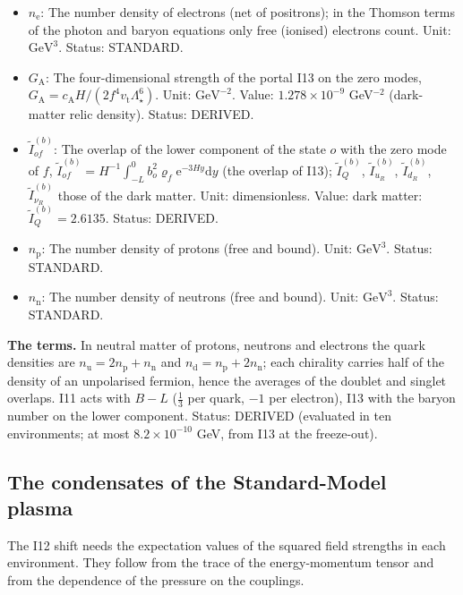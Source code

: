 \documentclass[
  10pt,
]{article}
\begin{document}
\begin{itemize}
  \(\tilde I_{e_R} = 0.3972\). Status: DERIVED.
\item
  \(n_{\mathrm{e}}\): The number density of electrons (net of
  positrons); in the Thomson terms of the photon and baryon equations
  only free (ionised) electrons count. Unit: \(\mathrm{GeV}^{3}\).
  Status: STANDARD.
\item
  \(G_{\mathrm{A}}\): The four-dimensional strength of the portal I13 on
  the zero modes,
  \(G_{\mathrm{A}} = c_{\mathrm{A}}H/(2f^4v_{\mathrm{t}}\Lambda_\star^6)\).
  Unit: \(\mathrm{GeV}^{-2}\). Value: \(1.278\times10^{-9}\)
  GeV\(^{-2}\) (dark-matter relic density). Status: DERIVED.
\item
  \(\tilde I^{(b)}_{of}\): The overlap of the lower component of the
  state \(o\) with the zero mode of \(f\),
  \(\tilde I^{(b)}_{of} = H^{-1}\int_{-L}^{0}b_o^2\varrho_f\mathrm{e}^{-3Hy}\mathrm{d}y\)
  (the overlap of I13); \(\tilde I^{(b)}_Q\), \(\tilde I^{(b)}_{u_R}\),
  \(\tilde I^{(b)}_{d_R}\), \(\tilde I^{(b)}_{\nu_R}\) those of the dark
  matter. Unit: dimensionless. Value: dark matter:
  \(\tilde I^{(b)}_Q = 2.6135\). Status: DERIVED.
\item
  \(n_{\mathrm{p}}\): The number density of protons (free and bound).
  Unit: \(\mathrm{GeV}^{3}\). Status: STANDARD.
\item
  \(n_{\mathrm{n}}\): The number density of neutrons (free and bound).
  Unit: \(\mathrm{GeV}^{3}\). Status: STANDARD.
\end{itemize}

\textbf{The terms.} In neutral matter of protons, neutrons and electrons
the quark densities are
\(n_{\mathrm{u}} = 2n_{\mathrm{p}} + n_{\mathrm{n}}\) and
\(n_{\mathrm{d}} = n_{\mathrm{p}} + 2n_{\mathrm{n}}\); each chirality
carries half of the density of an unpolarised fermion, hence the
averages of the doublet and singlet overlaps. I11 acts with \(B - L\)
(\(\frac13\) per quark, \(-1\) per electron), I13 with the baryon number
on the lower component. Status: DERIVED (evaluated in ten environments;
at most \(8.2\times10^{-10}\) GeV, from I13 at the freeze-out).

\hypertarget{the-condensates-of-the-standard-model-plasma}{%
\subsection{The condensates of the Standard-Model
plasma}\label{the-condensates-of-the-standard-model-plasma}}

The I12 shift needs the expectation values of the squared field
strengths in each environment. They follow from the trace of the
energy-momentum tensor and from the dependence of the pressure on the
couplings.
\end{document}
